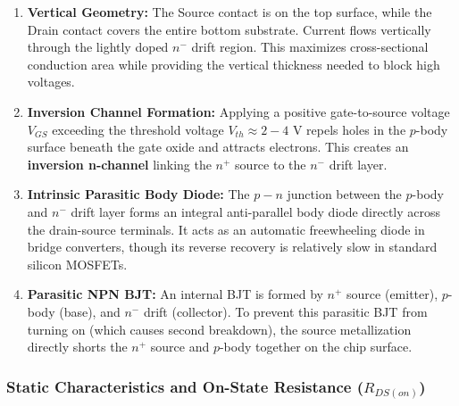 \documentclass[11pt,a4paper]{article}
\begin{document}
\begin{enumerate}[leftmargin=*]
  \item \textbf{Vertical Geometry:} The Source contact is on the top surface, while the Drain contact covers the entire bottom substrate. Current flows vertically through the lightly doped $n^-$ drift region. This maximizes cross-sectional conduction area while providing the vertical thickness needed to block high voltages.
  \item \textbf{Inversion Channel Formation:} Applying a positive gate-to-source voltage $V_{GS}$ exceeding the threshold voltage $V_{th} \approx 2 - 4\text{ V}$ repels holes in the $p$-body surface beneath the gate oxide and attracts electrons. This creates an \textbf{inversion n-channel} linking the $n^+$ source to the $n^-$ drift layer.
  \item \textbf{Intrinsic Parasitic Body Diode:} The $p-n$ junction between the $p$-body and $n^-$ drift layer forms an integral anti-parallel body diode directly across the drain-source terminals. It acts as an automatic freewheeling diode in bridge converters, though its reverse recovery is relatively slow in standard silicon MOSFETs.
  \item \textbf{Parasitic NPN BJT:} An internal BJT is formed by $n^+$ source (emitter), $p$-body (base), and $n^-$ drift (collector). To prevent this parasitic BJT from turning on (which causes second breakdown), the source metallization directly shorts the $n^+$ source and $p$-body together on the chip surface.
\end{enumerate}

\subsubsection{Static Characteristics and On-State Resistance ($R_{DS(on)}$)}
\end{document}
